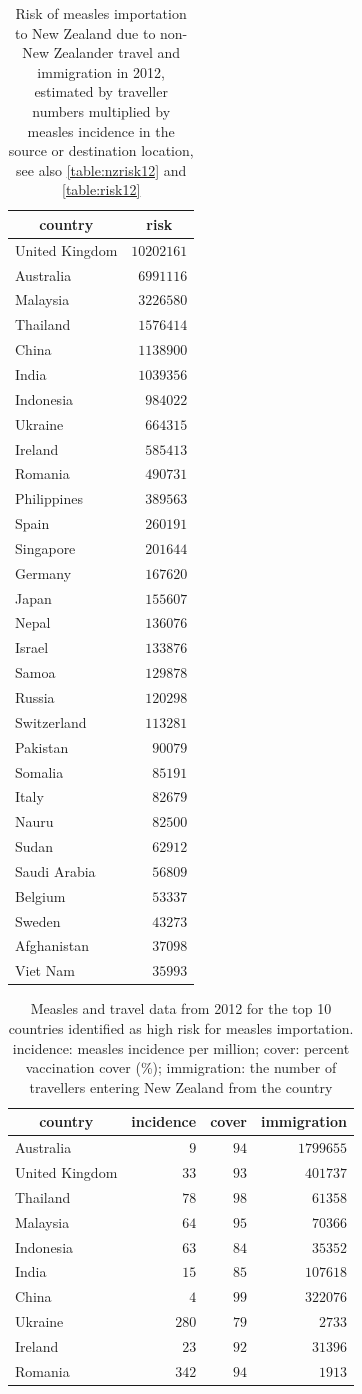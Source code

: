 \documentclass{article}
\begin{document}
\begin{table}
\caption{Risk of measles importation to New Zealand due to non-New Zealander travel and immigration in 2012, estimated by traveller numbers multiplied by measles incidence in the source or destination location, see also \autoref{table:nzrisk12} and \autoref{table:risk12}}
\begin{center}
\begin{tabular}{lr}
\hline\hline
\multicolumn{1}{c}{country}&\multicolumn{1}{c}{risk}\tabularnewline
\hline
United Kingdom&$10202161$\tabularnewline
Australia&$ 6991116$\tabularnewline
Malaysia&$ 3226580$\tabularnewline
Thailand&$ 1576414$\tabularnewline
China&$ 1138900$\tabularnewline
India&$ 1039356$\tabularnewline
Indonesia&$  984022$\tabularnewline
Ukraine&$  664315$\tabularnewline
Ireland&$  585413$\tabularnewline
Romania&$  490731$\tabularnewline
Philippines&$  389563$\tabularnewline
Spain&$  260191$\tabularnewline
Singapore&$  201644$\tabularnewline
Germany&$  167620$\tabularnewline
Japan&$  155607$\tabularnewline
Nepal&$  136076$\tabularnewline
Israel&$  133876$\tabularnewline
Samoa&$  129878$\tabularnewline
Russia&$  120298$\tabularnewline
Switzerland&$  113281$\tabularnewline
Pakistan&$   90079$\tabularnewline
Somalia&$   85191$\tabularnewline
Italy&$   82679$\tabularnewline
Nauru&$   82500$\tabularnewline
Sudan&$   62912$\tabularnewline
Saudi Arabia&$   56809$\tabularnewline
Belgium&$   53337$\tabularnewline
Sweden&$   43273$\tabularnewline
Afghanistan&$   37098$\tabularnewline
Viet Nam&$   35993$\tabularnewline
\hline
\end{tabular}\end{center}\label{table:imrisk12}
\end{table}


\begin{table}
\caption{Measles and travel data from 2012 for the top 10 countries identified as high risk for measles importation. incidence: measles incidence per million; cover: percent vaccination cover (\%); immigration: the number of travellers entering New Zealand from the country}
\begin{center}
\begin{tabular}{lrrr}
\hline\hline
\multicolumn{1}{c}{country}&\multicolumn{1}{c}{incidence}&\multicolumn{1}{c}{cover}&\multicolumn{1}{c}{immigration}\tabularnewline
\hline
Australia&$  9$&$94$&$1799655$\tabularnewline
United Kingdom&$ 33$&$93$&$ 401737$\tabularnewline
Thailand&$ 78$&$98$&$  61358$\tabularnewline
Malaysia&$ 64$&$95$&$  70366$\tabularnewline
Indonesia&$ 63$&$84$&$  35352$\tabularnewline
India&$ 15$&$85$&$ 107618$\tabularnewline
China&$  4$&$99$&$ 322076$\tabularnewline
Ukraine&$280$&$79$&$   2733$\tabularnewline
Ireland&$ 23$&$92$&$  31396$\tabularnewline
Romania&$342$&$94$&$   1913$\tabularnewline
\hline
\end{tabular}\end{center}\label{table:toprisk}
\end{table}
\end{document}
